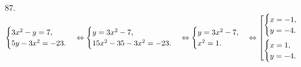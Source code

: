87. $\begin{cases}
3x^2-y=7,\\
5y-3x^2=-23.
\end{cases}\Leftrightarrow\begin{cases}
y=3x^2-7,\\
15x^2-35-3x^2=-23.
\end{cases}\Leftrightarrow\begin{cases}
y=3x^2-7,\\
x^2=1.
\end{cases}\Leftrightarrow\left[
      \begin{gathered} \begin{cases}x=-1,\\ y=-4.\end{cases}\hfill\\
      \begin{cases}x=1,\\ y=-4.\end{cases}\hfill \end{gathered}\right.$\\
